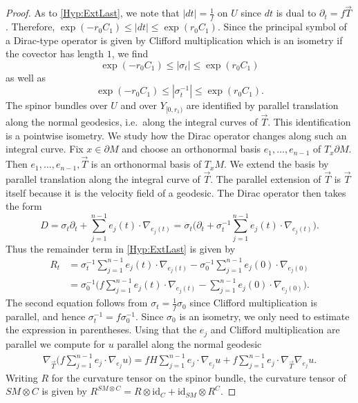 \documentclass[a4paper,10pt,reqno]{amsart}
\newcommand{\id}{\mathrm{id}}
\newcommand{\dM}{\partial M}
\theoremstyle{definition}
\begin{document}
\begin{proof}
As to \ref{Hyp:ExtLast}, we note that $|dt|=\frac{1}{f}$ on $U$ since $dt$ is dual to $\partial_t = f\vec{T}$.
Therefore, $\exp(-r_0C_1) \le |dt| \le \exp(r_0C_1)$.
Since the principal symbol of a Dirac-type operator is given by Clifford multiplication which is an isometry if the covector has length $1$, we find
$$
\exp(-r_0C_1) \le |\sigma_t| \le \exp(r_0C_1)
$$
as well as
$$
\exp(-r_0C_1) \le |\sigma_t^{-1}| \le \exp(r_0C_1) .
$$
The spinor bundles over $U$ and over $Y_{[0,r_1)}$ are identified by parallel translation along the normal geodesics, i.e.\ along the integral curves of $\vec{T}$.
This identification is a pointwise isometry.
We study how the Dirac operator changes along such an integral curve.
Fix $x\in\dM$ and choose an orthonormal basis $e_1,\dots,e_{n-1}$ of $T_x\dM$.
Then $e_1,\dots,e_{n-1},\vec{T}$ is an orthonormal basis of $T_xM$.
We extend the basis by parallel translation along the integral curve of $\vec{T}$.
The parallel extension of $\vec{T}$ is $\vec{T}$ itself because it is the velocity field of a geodesic.
The Dirac operator then takes the form
\begin{equation*}
D
=
\sigma_t \partial_t + \sum_{j=1}^{n-1} e_j(t)\cdot \nabla_{e_j(t)}
=
\sigma_t \Big(\partial_t + \sigma_t^{-1}\sum_{j=1}^{n-1} e_j(t)\cdot \nabla_{e_j(t)}\Big) .
\end{equation*}
Thus the remainder term in \ref{Hyp:ExtLast} is given by
\begin{align*}
R_t
 & =
\sigma_t^{-1}\sum_{j=1}^{n-1} e_j(t)\cdot \nabla_{e_j(t)} - \sigma_0^{-1}\sum_{j=1}^{n-1} e_j(0)\cdot \nabla_{e_j(0)} \\
 & =
\sigma_0^{-1}\bigg(f\sum_{j=1}^{n-1} e_j(t)\cdot \nabla_{e_j(t)} - \sum_{j=1}^{n-1} e_j(0)\cdot \nabla_{e_j(0)} \bigg) .
\end{align*}
The second equation follows from $\sigma_t = \frac{1}{f}\sigma_0$ since Clifford multiplication is parallel, and hence $\sigma_t^{-1} = f\sigma_0^{-1}$.
Since $\sigma_0$ is an isometry, we only need to estimate the expression in parentheses.
Using that the $e_j$ and Clifford multiplication are parallel we compute for $u$ parallel along the normal geodesic
\begin{align}
\nabla_{\vec{T}}\bigg(f\sum_{j=1}^{n-1} e_j\cdot \nabla_{e_j}u\bigg)
=
fH\sum_{j=1}^{n-1} e_j\cdot \nabla_{e_j}u + f\sum_{j=1}^{n-1} e_j\cdot \nabla_{\vec{T}}\nabla_{e_j}u .
\label{eq:Rtdot}
\end{align}
Writing $R$ for the curvature tensor on the spinor bundle, the curvature tensor of $SM\otimes C$ is given by $R^{SM\otimes C}=R\otimes \id_C + \id_{SM}\otimes R^C$.

\end{proof}
\end{document}
